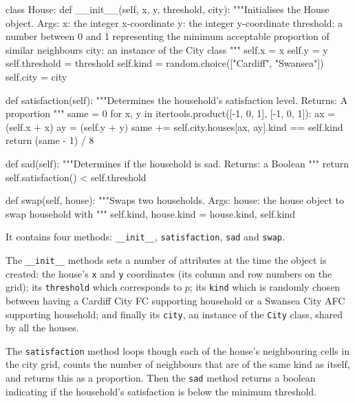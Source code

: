 \begin{pyin}
class House:
    def __init__(self, x, y, threshold, city):
        """Initialises the House object.
        Args:
            x: the integer x-coordinate
            y: the integer y-coordinate
            threshold: a number between 0 and 1 representing
              the minimum acceptable proportion of similar
              neighbours
            city: an instance of the City class
        """
        self.x = x
        self.y = y
        self.threshold = threshold
        self.kind = random.choice(["Cardiff", "Swansea"])
        self.city = city

    def satisfaction(self):
        """Determines the household's satisfaction level.
        Returns:
            A proportion
        """
        same = 0
        for x, y in itertools.product([-1, 0, 1], [-1, 0, 1]):
            ax = (self.x + x) %
            ay = (self.y + y) %
            same += self.city.houses[ax, ay].kind == self.kind
        return (same - 1) / 8

    def sad(self):
        """Determines if the household is sad.
        Returns:
            a Boolean
        """
        return self.satisfaction() < self.threshold

    def swap(self, house):
        """Swaps two households.
        Args:
            house: the house object to swap household with
        """
        self.kind, house.kind = house.kind, self.kind
\end{pyin}

It contains four methods: \texttt{__init__},
\texttt{satisfaction}, \texttt{sad} and
\texttt{swap}.

The \texttt{__init__} methods sets a number of attributes at the
time the object is created: the house's \texttt{x} and
\texttt{y} coordinates (its column and row numbers on the grid);
its \texttt{threshold} which corresponds to \(p\); its
\texttt{kind} which is randomly chosen between having a Cardiff City
FC supporting household or a Swansea City AFC supporting household; and finally
its \texttt{city}, an instance of the \texttt{City}
class, shared by all the houses.

The \texttt{satisfaction} method loops though each of the house's
neighbouring cells in the city grid, counts the number of neighbours that are
of the same kind as itself, and returns this as a proportion.
Then the \texttt{sad} method returns a boolean indicating if the
household's satisfaction is below the minimum threshold.

